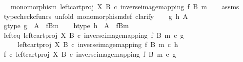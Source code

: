 \begin{isabellebody}
\ \ \ {\isachardoublequoteopen}monomorphism\ {\isacharparenleft}{\kern0pt}left{\isacharunderscore}{\kern0pt}cart{\isacharunderscore}{\kern0pt}proj\ X\ B\ {\isasymcirc}\isactrlsub c\ inverse{\isacharunderscore}{\kern0pt}image{\isacharunderscore}{\kern0pt}mapping\ f\ B\ m{\isacharparenright}{\kern0pt}{\isachardoublequoteclose}\isanewline
%
\isadelimproof
\ \ %
\endisadelimproof
%
\isatagproof
{}\isamarkupfalse%
\ assms\isanewline
{}\isamarkupfalse%
\ {\isacharparenleft}{\kern0pt}typecheck{\isacharunderscore}{\kern0pt}cfuncs{\isacharcomma}{\kern0pt}\ unfold\ monomorphism{\isacharunderscore}{\kern0pt}def{}{\isacharcomma}{\kern0pt}\ clarify{\isacharparenright}{\kern0pt}\isanewline
\ \ \isamarkupfalse%
\ g\ h\ A\isanewline
\ \ \isamarkupfalse%
\ g{\isacharunderscore}{\kern0pt}type{\isacharcolon}{\kern0pt}\ {\isachardoublequoteopen}g\ {\isacharcolon}{\kern0pt}\ A\ {\isasymrightarrow}\ {\isacharparenleft}{\kern0pt}f\isactrlsup {\isacharminus}{\kern0pt}B{\isasymrparr}\isactrlbsub m\isactrlesub {\isacharparenright}{\kern0pt}{\isachardoublequoteclose}\isanewline
\ \ \isamarkupfalse%
\ h{\isacharunderscore}{\kern0pt}type{\isacharcolon}{\kern0pt}\ {\isachardoublequoteopen}h\ {\isacharcolon}{\kern0pt}\ A\ {\isasymrightarrow}\ {\isacharparenleft}{\kern0pt}f\isactrlsup {\isacharminus}{\kern0pt}B{\isasymrparr}\isactrlbsub m\isactrlesub {\isacharparenright}{\kern0pt}{\isachardoublequoteclose}\isanewline
\ \ \isamarkupfalse%
\ left{\isacharunderscore}{\kern0pt}eq{\isacharcolon}{\kern0pt}\ {\isachardoublequoteopen}{\isacharparenleft}{\kern0pt}left{\isacharunderscore}{\kern0pt}cart{\isacharunderscore}{\kern0pt}proj\ X\ B\ {\isasymcirc}\isactrlsub c\ inverse{\isacharunderscore}{\kern0pt}image{\isacharunderscore}{\kern0pt}mapping\ f\ B\ m{\isacharparenright}{\kern0pt}\ {\isasymcirc}\isactrlsub c\ g\isanewline
\ \ \ \ {\isacharequal}{\kern0pt}\ {\isacharparenleft}{\kern0pt}left{\isacharunderscore}{\kern0pt}cart{\isacharunderscore}{\kern0pt}proj\ X\ B\ {\isasymcirc}\isactrlsub c\ inverse{\isacharunderscore}{\kern0pt}image{\isacharunderscore}{\kern0pt}mapping\ f\ B\ m{\isacharparenright}{\kern0pt}\ {\isasymcirc}\isactrlsub c\ h{\isachardoublequoteclose}\isanewline
\ \ \isamarkupfalse%
\ \isamarkupfalse%
\ {\isachardoublequoteopen}f\ {\isasymcirc}\isactrlsub c\ {\isacharparenleft}{\kern0pt}left{\isacharunderscore}{\kern0pt}cart{\isacharunderscore}{\kern0pt}proj\ X\ B\ {\isasymcirc}\isactrlsub c\ inverse{\isacharunderscore}{\kern0pt}image{\isacharunderscore}{\kern0pt}mapping\ f\ B\ m{\isacharparenright}{\kern0pt}\ {\isasymcirc}\isactrlsub c\ g\isanewline

\end{isabellebody}
